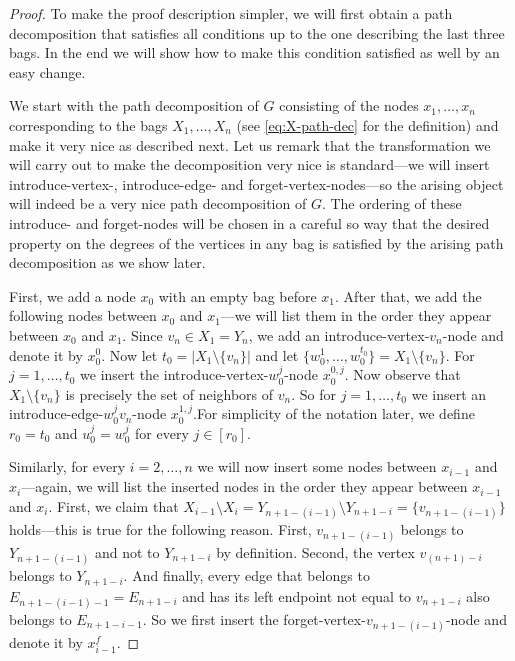 \documentclass[a4paper,UKenglish,cleveref, autoref, thm-restate]{lipics-v2021}
\begin{document}
\begin{proof}
	To make the proof description simpler, we will first obtain a path decomposition that satisfies all conditions up to the one describing the last three bags.
	In the end we will show how to make this condition satisfied as well by an easy change. 
	
	We start with the path decomposition of $G$ consisting of the nodes $x_1, \dots, x_n$ corresponding to the bags $X_1, \dots, X_n$ (see \eqref{eq:X-path-dec} for the definition) and make it very nice as described next. 
	Let us remark that the transformation we will carry out to make the decomposition very nice is standard---we will insert introduce-vertex-, introduce-edge- and forget-vertex-nodes---so the arising object will indeed be a very nice path decomposition of $G$. 
	The ordering of these introduce- and forget-nodes will be chosen in a careful so way that the desired property on the degrees of the vertices in any bag is satisfied by the arising path decomposition as we show later.

	First, we add a node $x_0$ with an empty bag before $x_1$.
	After that, we add the following nodes between $x_0$ and $x_1$---we will list them in the order they appear between $x_0$ and $x_1$.
	Since $v_n \in X_1 = Y_n$, we add an introduce-vertex-$v_n$-node and denote it by $x_0^0$. 
	Now let $t_0 = |X_1 \setminus \{v_n\}|$ and let $\{w^1_0, \dots, w_0^{t_0}\} = X_1 \setminus \{v_n\}$.
	For $j = 1, \dots, t_0$ we insert the introduce-vertex-$w_0^j$-node $x_0^{0,j}$. 
	Now observe that $X_1 \setminus \{v_n\}$ is precisely the set of neighbors of $v_n$. 
	So for $j = 1, \dots, t_0$ we insert an introduce-edge-$w_0^j v_n$-node $x_0^{1,j}$.For simplicity of the notation later, we define $r_0 = t_0$ and $u_0^j = w_0^j$ for every $j \in [r_0]$.
	
	Similarly, for every $i = 2, \dots, n$ we will now insert some nodes between $x_{i-1}$ and $x_i$---again, we will list the inserted nodes in the order they appear between $x_{i-1}$ and $x_i$.
	First, we claim that $X_{i-1} \setminus X_i = Y_{n+1-(i-1)} \setminus Y_{n+1-i} = \{v_{n+1-(i-1)}\}$ holds---this is true for the following reason.
	First, $v_{n+1-(i-1)}$ belongs to $Y_{n+1-(i-1)}$ and not to $Y_{n+1-i}$ by definition.
	Second, the vertex $v_{(n+1)-i}$ belongs to $Y_{n+1-i}$.
	And finally, every edge that belongs to $E_{n+1-(i-1)-1} = E_{n+1-i}$ and has its left endpoint not equal to $v_{n+1-i}$ also belongs to $E_{n+1-i-1}$.
	So we first insert the forget-vertex-$v_{n+1-(i-1)}$-node and denote it by $x_{i-1}^{f}$.
	

\end{proof}
\end{document}
